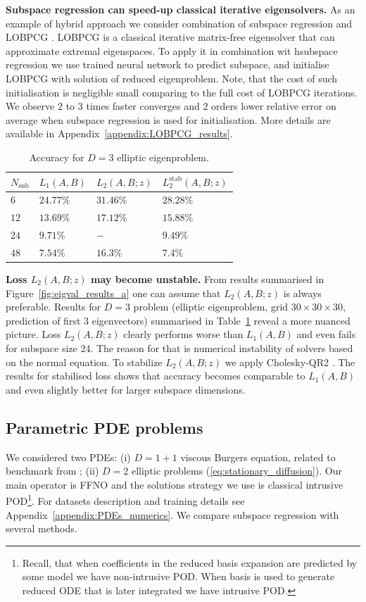 \documentclass{article}
\begin{document}
\textbf{Subspace regression can speed-up classical iterative eigensolvers.}
As an example of hybrid approach we consider combination of subspace regression and LOBPCG \cite{knyazev2001toward}. LOBPCG is a classical iterative matrix-free eigensolver that can approximate extremal eigenspaces. To apply it in combination wit hsubspace regression we use trained neural network to predict subspace, and initialise LOBPCG with solution of reduced eigenproblem. Note, that the cost of such initialisation is negligible small comparing to the full cost of LOBPCG iterations. We observe $2$ to $3$ times faster converges and $2$ orders lower relative error on average when subspace regression is used for initialisation. More details are available in Appendix~\ref{appendix:LOBPCG_results}.

\begin{table}
\caption{Accuracy for $D=3$ elliptic eigenproblem.}
\label{table:D3_problems}
\begin{tabular}{llll}
\toprule
$N_{\text{sub}}$ & $L_1(A, B)$ & $L_2(A, B; z)$ & $L^{\text{stab}}_2(A, B; z)$ \\
\midrule
$6$ & $24.77\%$ & $31.46\%$ & $28.28\%$ \\
$12$ & $13.69\%$ & $17.12\%$ & $15.88\%$ \\
$24$  & $9.71\%$ & $-$ & $9.49\%$ \\
$48$  & $7.54\%$ & $16.3\%$ & $7.4\%$ \\
\bottomrule
\end{tabular}
\end{table} 

\textbf{Loss $L_2(A, B; z)$ may become unstable.} From results summarised in Figure~\ref{fig:eigval_results_a} one can assume that $L_2(A, B; z)$ is always preferable. Results for $D=3$ problem (elliptic eigenproblem, grid $30\times30\times30$, prediction of first $3$ eigenvectors) summarised in Table~\ref{table:D3_problems} reveal a more nuanced picture. Loss $L_2(A, B; z)$ clearly performs worse than $L_1(A, B)$ and even fails for subspace size $24$. The reason for that is numerical instability of solvers based on the normal equation.
To stabilize $L_2(A, B; z)$ we apply Cholesky-QR2 \cite{yamamoto2015roundoff}. The results for stabilised loss shows that accuracy becomes comparable to $L_1(A, B)$ and even slightly better for larger subspace dimensions.


\subsection{Parametric PDE problems}
We considered two PDEs: (i) $D=1+1$ viscous Burgers equation, related to benchmark from \cite{li2020fourier};  (ii) $D=2$ elliptic problems (\ref{eq:stationary_diffusion}). Our main operator is FFNO and the solutions strategy we use is classical intrusive POD\footnote{Recall, that when coefficients in the reduced basis expansion are predicted by some model we have non-intrusive POD. When basis is used to generate reduced ODE that is later integrated we have intrusive POD.}. For datasets description and training details see Appendix~\ref{appendix:PDEs_numerics}. We compare subspace regression with several methods.
\end{document}
